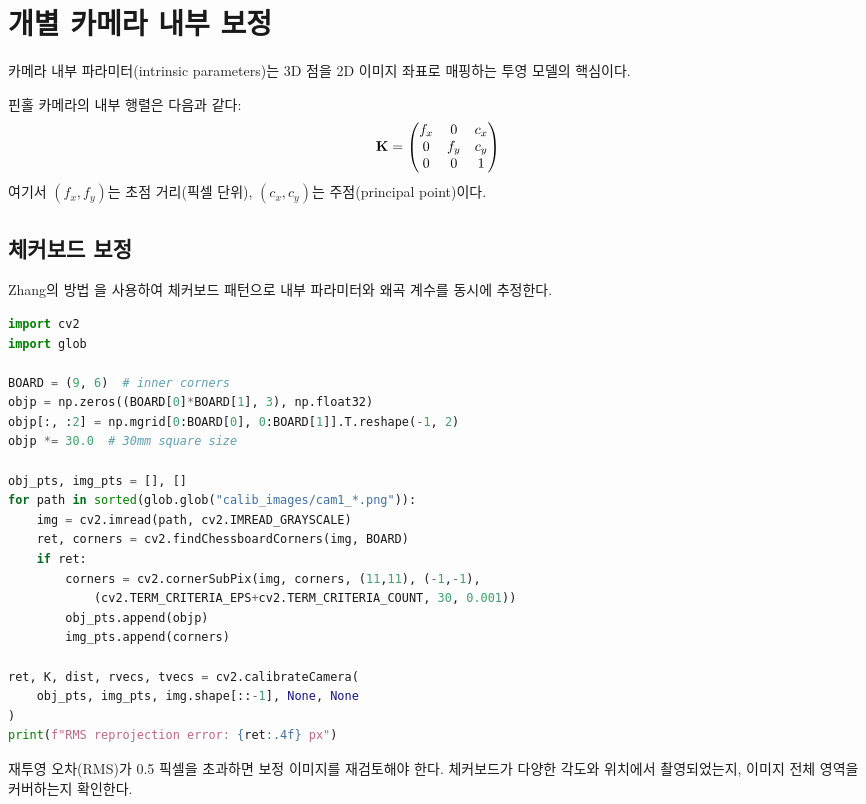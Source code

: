 \documentclass[11pt, a4paper]{report}
\begin{document}
\section{개별 카메라 내부 보정}

카메라 내부 파라미터(intrinsic parameters)는 3D 점을 2D 이미지 좌표로 매핑하는
투영 모델의 핵심이다.

\begin{definition}[카메라 내부 행렬]
핀홀 카메라의 내부 행렬은 다음과 같다:
\begin{equation}
  \mathbf{K} = \begin{pmatrix} f_x & 0 & c_x \\ 0 & f_y & c_y \\ 0 & 0 & 1 \end{pmatrix}
\end{equation}
여기서 $(f_x, f_y)$는 초점 거리(픽셀 단위), $(c_x, c_y)$는 주점(principal point)이다.
\end{definition}

\subsection{체커보드 보정}

Zhang의 방법 \cite{zhang2000}을 사용하여 체커보드 패턴으로 내부 파라미터와 왜곡 계수를 동시에 추정한다.

\begin{codebox}[title={체커보드 보정 코드}]
\begin{lstlisting}[language=Python]
import cv2
import glob

BOARD = (9, 6)  # inner corners
objp = np.zeros((BOARD[0]*BOARD[1], 3), np.float32)
objp[:, :2] = np.mgrid[0:BOARD[0], 0:BOARD[1]].T.reshape(-1, 2)
objp *= 30.0  # 30mm square size

obj_pts, img_pts = [], []
for path in sorted(glob.glob("calib_images/cam1_*.png")):
    img = cv2.imread(path, cv2.IMREAD_GRAYSCALE)
    ret, corners = cv2.findChessboardCorners(img, BOARD)
    if ret:
        corners = cv2.cornerSubPix(img, corners, (11,11), (-1,-1),
            (cv2.TERM_CRITERIA_EPS+cv2.TERM_CRITERIA_COUNT, 30, 0.001))
        obj_pts.append(objp)
        img_pts.append(corners)

ret, K, dist, rvecs, tvecs = cv2.calibrateCamera(
    obj_pts, img_pts, img.shape[::-1], None, None
)
print(f"RMS reprojection error: {ret:.4f} px")
\end{lstlisting}
\end{codebox}

\begin{importantnote}
재투영 오차(RMS)가 0.5 픽셀을 초과하면 보정 이미지를 재검토해야 한다.
체커보드가 다양한 각도와 위치에서 촬영되었는지, 이미지 전체 영역을 커버하는지 확인한다.
\end{importantnote}
\end{document}

